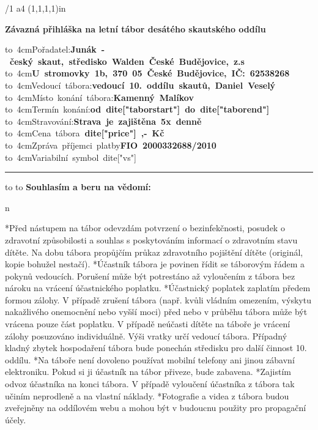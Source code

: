 
\typosize[11/13]
\margins/1 a4 (1,1,1,1)in
\chyph
\fontfam[timesroman]
\nopagenumbers

\centerline{
\typosize[20/13]
\bf
Závazná přihláška na letní tábor desátého skautského oddílu
}
\vskip 1cm
\hbox{\hbox to 4cm{Pořadatel:\hfil}\bf Junák - český skaut, středisko Walden České Budějovice, z.s}
\hbox{\hbox to 4cm{\hfil}\bf U stromovky 1b, 370 05 České Budějovice, IČ: 62538268}
\hbox{\hbox to 4cm{Vedoucí tábora:\hfil}\bf vedoucí 10. oddílu skautů, Daniel Veselý}
\hbox{\hbox to 4cm{Místo konání tábora:\hfil}\bf Kamenný Malíkov}
\hbox{\hbox to 4cm{Termín konání:\hfil}\bf od {{dite["taborstart"]}} do {{dite["taborend"]}}}
\hbox{\hbox to 4cm{Stravování:\hfil}\bf Strava je zajištěna 5x denně}
\hbox{\hbox to 4cm{Cena tábora\hfil}\bf {{ dite["price"] }},- Kč}
\hbox{\hbox to 4cm{Zpráva příjemci platby\hfil}\bf FIO 2000332688/2010}
\hbox{\hbox to 4cm{Variabilní symbol\hfil}{{ dite["vs"] }}}

\bigskip
\hrule
\bigskip

{
\typosize[11/18]
\hbox to 
\hbox to 
}
\smallskip
\noindent
{\bf Souhlasím a beru na vědomí:}
{
\begitems \style n
\leftskip=1cm
\rightskip=0cm
\parskip=5pt
\par
*Před nástupem na tábor odevzdám potvrzení o bezinfekčnosti, posudek o zdravotní způsobilosti a souhlas s poskytováním informací o zdravotním stavu dítěte. 
Na dobu tábora propůjčím průkaz zdravotního pojištění dítěte (originál, kopie bohužel nestačí).
*Účastník tábora je povinen řídit se táborovým řádem a
pokynů vedoucích. Porušení může být potrestáno až
vyloučením z tábora bez nároku na vrácení účastnického
poplatku.
*Účastnický poplatek zaplatím předem formou zálohy. V
případě zrušení tábora (např. kvůli vládním omezením,
výskytu nakažlivého onemocnění nebo vyšší moci) před nebo
v průběhu tábora může být vrácena pouze část poplatku. V
případě neúčasti dítěte na táboře je vrácení zálohy posuzováno individuálně. Výši vratky určí vedoucí tábora.
Případný kladný zbytek hospodaření tábora bude ponechán středisku pro další činnost 10. oddílu.
*Na táboře není dovoleno používat mobilní telefony ani 
jinou zábavní elektroniku. Pokud si ji účastník na tábor 
přiveze, bude zabavena.
*Zajistím odvoz účastníka na konci tábora. V případě 
vyloučení účastníka z tábora tak učiním neprodleně a na 
vlastní náklady.
*Fotografie a videa z tábora budou zveřejněny na oddílovém 
webu a mohou být v budoucnu použity pro propagační účely.
\enditems
}

